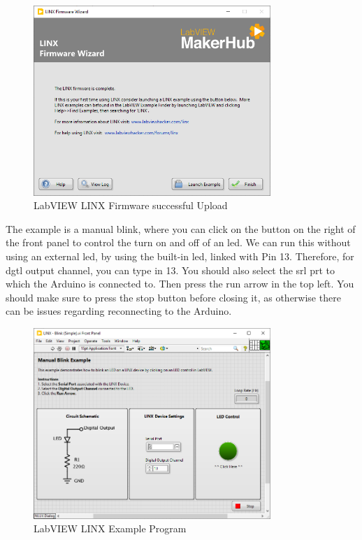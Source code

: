 \documentclass[a4paper,11pt]{report}
\begin{document}
\begin{figure}[H]
\centering
\includegraphics[width=0.8\textwidth]{screenshots/labviewarduino6}
\caption{LabVIEW LINX Firmware successful Upload}
\end{figure}

The example is a manual blink, where you can click on the button on the right of the front panel to control the turn on and off of an \gls{led}. We can run this without using an external \gls{led}, by using the built-in \gls{led}, linked with Pin 13. Therefore, for \gls{dgtl} output channel, you can type in 13. You should also select the \gls{srl} \gls{prt}  to which the Arduino is connected to. Then press the run arrow in the top left. You should make sure to press the stop button before closing it, as otherwise there can be issues regarding reconnecting to the Arduino.

\begin{figure}[H]
\centering
\includegraphics[width=0.8\textwidth]{screenshots/labviewarduino7}
\caption{LabVIEW LINX Example Program}
\end{figure}
\end{document}
